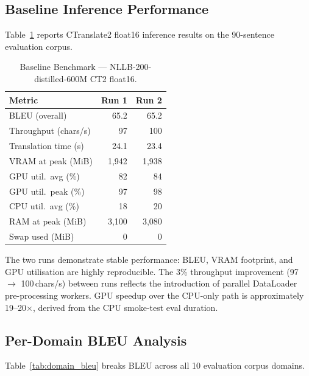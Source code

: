 \documentclass[sigconf]{acmart}
\begin{document}
\subsection{Baseline Inference Performance}

Table~\ref{tab:benchmark} reports CTranslate2 float16 inference results on the
90-sentence evaluation corpus.

\begin{table}[htbp]
\caption{Baseline Benchmark --- NLLB-200-distilled-600M CT2 float16.}
\label{tab:benchmark}
\centering
\begin{tabular}{lrr}
\toprule
Metric & Run 1 & Run 2 \\
\midrule
BLEU (overall) & 65.2 & 65.2 \\
Throughput (chars/s) & 97 & 100 \\
Translation time (s) & 24.1 & 23.4 \\
VRAM at peak (MiB) & 1,942 & 1,938 \\
GPU util.\ avg (\%) & 82 & 84 \\
GPU util.\ peak (\%) & 97 & 98 \\
CPU util.\ avg (\%) & 18 & 20 \\
RAM at peak (MiB) & 3,100 & 3,080 \\
Swap used (MiB) & 0 & 0 \\
\bottomrule
\end{tabular}
\end{table}

The two runs demonstrate stable performance: BLEU, VRAM footprint, and GPU
utilisation are highly reproducible.
The 3\% throughput improvement (97 $\to$ 100\,chars/s) between runs reflects
the introduction of parallel DataLoader pre-processing workers.
GPU speedup over the CPU-only path is approximately 19--20$\times$, derived from
the CPU smoke-test eval duration.

\subsection{Per-Domain BLEU Analysis}

Table~\ref{tab:domain_bleu} breaks BLEU across all 10 evaluation corpus domains.
\end{document}
